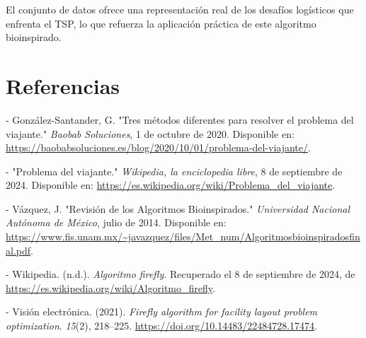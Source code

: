 \documentclass{article}
\begin{document}
El conjunto de datos ofrece una representación real de los desafíos logísticos que enfrenta el TSP, lo que refuerza la aplicación práctica de este algoritmo bioinspirado.

\section{Referencias}

- González-Santander, G. "Tres métodos diferentes para resolver el problema del viajante." \textit{Baobab Soluciones}, 1 de octubre de 2020. Disponible en: \url{https://baobabsoluciones.es/blog/2020/10/01/problema-del-viajante/}.

- "Problema del viajante." \textit{Wikipedia, la enciclopedia libre}, 8 de septiembre de 2024. Disponible en: \url{https://es.wikipedia.org/wiki/Problema_del_viajante}.

- Vázquez, J. "Revisión de los Algoritmos Bioinspirados." \textit{Universidad Nacional Autónoma de México}, julio de 2014. Disponible en: \url{https://www.fis.unam.mx/~javazquez/files/Met_num/Algoritmosbioinspiradosfinal.pdf}.

- Wikipedia. (n.d.). \textit{Algoritmo firefly}. Recuperado el 8 de septiembre de 2024, de \url{https://es.wikipedia.org/wiki/Algoritmo_firefly}.

- Visión electrónica. (2021). \textit{Firefly algorithm for facility layout problem optimization}. \textit{15}(2), 218–225. \url{https://doi.org/10.14483/22484728.17474}.
\end{document}
